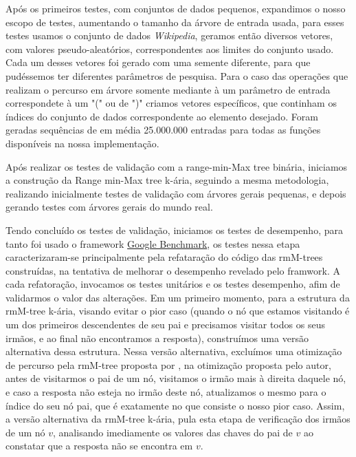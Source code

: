 Após os primeiros testes, com conjuntos de dados pequenos, expandimos o nosso escopo de testes, aumentando o tamanho da árvore de entrada usada, 
para esses testes usamos o conjunto de dados \textit{Wikipedia}, geramos então diversos vetores, com valores pseudo-aleatórios, correspondentes
aos limites do conjunto usado. Cada um desses vetores foi gerado com uma semente diferente, para que pudéssemos
ter diferentes parâmetros de pesquisa. Para o caso das operações que realizam o percurso em árvore somente mediante 
à um parâmetro de entrada correspondete à um "(" ou de ")" criamos vetores específicos, que continham os índices do conjunto de dados correspondente ao elemento 
desejado. Foram geradas sequências de em média 25.000.000 entradas para todas as funções disponíveis na nossa implementação.

Após realizar os testes de validação com a range-min-Max tree binária, iniciamos a construção da Range min-Max tree k-ária, seguindo a mesma metodologia,
realizando inicialmente testes de validação com árvores gerais pequenas, e depois gerando testes com árvores gerais do mundo real. 

Tendo concluído os testes de validação, iniciamos os testes de desempenho, para tanto foi usado o framework \href{https://github.com/google/benchmark}{Google Benchmark}, os testes nessa etapa caracterizaram-se
principalmente pela refataração do código das rmM-trees construídas, na tentativa de melhorar o desempenho revelado pelo framwork. 
A cada refatoração, invocamos os testes unitários e os testes  desempenho, afim de validarmos o valor das alterações. 
Em um primeiro momento, para a estrutura da rmM-tree k-ária, visando evitar o pior caso (quando o nó que estamos visitando é um dos primeiros descendentes de seu pai e precisamos visitar todos os seus irmãos, e ao final não encontramos a resposta), 
construímos uma versão alternativa dessa estrutura. 
Nessa versão alternativa, excluímos uma otimização de percurso pela rmM-tree proposta por \citet{book-compact-data-structures}, na otimização proposta pelo autor, 
antes de visitarmos o pai de um nó, visitamos o irmão mais à direita daquele nó, e caso a resposta não esteja no irmão deste nó, atualizamos o mesmo para o índice do seu nó pai, 
que é exatamente no que consiste o nosso pior caso. Assim, a versão alternativa da rmM-tree k-ária, pula esta etapa de verificação dos irmãos de um nó $v$, 
analisando imediamente os valores das chaves do pai de $v$ ao constatar que a resposta não se encontra em $v$.

